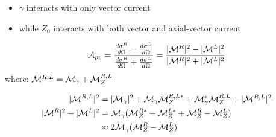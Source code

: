 \begin{itemize}
    \item $\gamma$ interacts with only vector current
    \item while $Z_0$ interacts with both vector and axial-vector current
\end{itemize}

\begin{equation*}
    \mathcal{A}_{pv} = \frac{\frac{d\sigma^R}{d\Omega} - \frac{d\sigma^L}{d\Omega}}{\frac{d\sigma^R}{d\Omega} + \frac{d\sigma^L}{d\Omega}} = \frac{|\mathcal{M}^R|^2 - |\mathcal{M}^L|^2}{|\mathcal{M}^R|^2 + |\mathcal{M}^L|^2}
\end{equation*}
where: $\mathcal{M}^{R, L} = \mathcal{M}_{\gamma} + \mathcal{M}_Z^{R,L}$

\begin{equation*}
    \begin{aligned}
	|\mathcal{M}^{R,L}|^2 &= |\mathcal{M}_\gamma|^2 + \mathcal{M}_\gamma\mathcal{M}_Z^{R,L*} + \mathcal{M}_\gamma^*\mathcal{M}_Z^{R,L} + |\mathcal{M}^{R,L}|^2	\\
	|\mathcal{M}^{R}|^2 - |\mathcal{M}^{L}|^2 &= \mathcal{M}_\gamma( \mathcal{M}_Z^{R*} - \mathcal{M}_Z^{L*} + \mathcal{M}_Z^{R} - \mathcal{M}_Z^L) \\
	&\approx 2\mathcal{M}_\gamma(\mathcal{M}_Z^R - \mathcal{M}_Z^L)
    \end{aligned}
\end{equation*}


